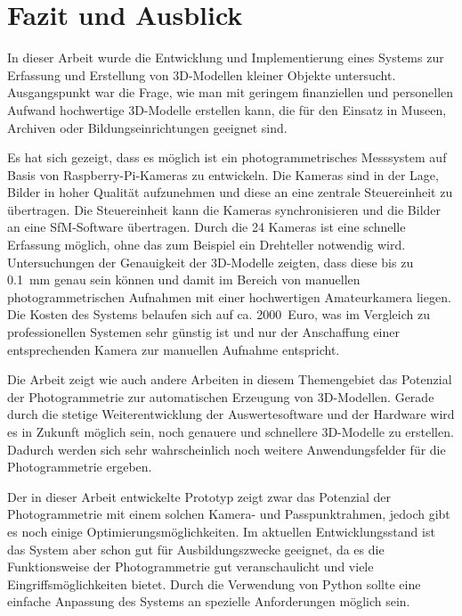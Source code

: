 \documentclass[./00PhotoBox.tex]{subfiles}
\begin{document}
\chapter{Fazit und Ausblick}
\label{c:fazitausblick}


In dieser Arbeit wurde die Entwicklung und Implementierung eines Systems zur Erfassung und Erstellung von 3D-Modellen kleiner Objekte untersucht. Ausgangspunkt war die Frage, wie man mit geringem finanziellen und personellen Aufwand hochwertige 3D-Modelle erstellen kann, die für den Einsatz in Museen, Archiven oder Bildungseinrichtungen geeignet sind.

Es hat sich gezeigt, dass es möglich ist ein photogrammetrisches Messsystem auf Basis von Raspberry-Pi-Kameras zu entwickeln. Die Kameras sind in der Lage, Bilder in hoher Qualität aufzunehmen und diese an eine zentrale Steuereinheit zu übertragen. Die Steuereinheit kann die Kameras synchronisieren und die Bilder an eine \acrshort{SfM}-Software übertragen. Durch die 24 Kameras ist eine schnelle Erfassung möglich, ohne das zum Beispiel ein Drehteller notwendig wird. Untersuchungen der Genauigkeit der 3D-Modelle zeigten, dass diese bis zu \SI{0,1}{\milli\metre} genau sein können und damit im Bereich von manuellen photogrammetrischen Aufnahmen mit einer hochwertigen Amateurkamera liegen. Die Kosten des Systems belaufen sich auf ca. \SI{2000}{Euro}, was im Vergleich zu professionellen Systemen sehr günstig ist und nur der Anschaffung einer entsprechenden Kamera zur manuellen Aufnahme entspricht.



Die Arbeit zeigt wie auch andere Arbeiten in diesem Themengebiet das Potenzial der Photogrammetrie zur automatischen Erzeugung von 3D-Modellen. Gerade durch die stetige Weiterentwicklung der Auswertesoftware und der Hardware wird es in Zukunft möglich sein, noch genauere und schnellere 3D-Modelle zu erstellen. Dadurch werden sich sehr wahrscheinlich noch weitere Anwendungsfelder für die Photogrammetrie ergeben.

Der in dieser Arbeit entwickelte Prototyp zeigt zwar das Potenzial der Photogrammetrie mit einem solchen Kamera- und Passpunktrahmen, jedoch gibt es noch einige Optimierungsmöglichkeiten. Im aktuellen Entwicklungsstand ist das System aber schon gut für Ausbildungszwecke geeignet, da es die Funktionsweise der Photogrammetrie gut veranschaulicht und viele Eingriffsmöglichkeiten bietet. Durch die Verwendung von Python sollte eine einfache Anpassung des Systems an spezielle Anforderungen möglich sein.
\end{document}
